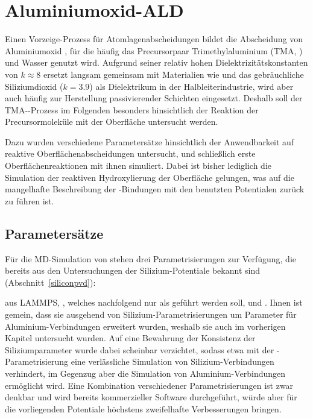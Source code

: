 \section{Aluminiumoxid-ALD}
\label{aluminaald}

Einen Vorzeige-Prozess für Atomlagenabscheidungen bildet die Abscheidung von Aluminiumoxid , für die häufig das Precursorpaar Trimethylaluminium (TMA, ) und Wasser genutzt wird\cite{puurunen_surface_2005}.
Aufgrund seiner relativ hohen Dielektrizitätskonstanten von $k\approx 8$ ersetzt  langsam gemeinsam mit Materialien wie  und \cite{smith_chemical_2000} das gebräuchliche Siliziumdioxid ($k=3.9$) als Dielektrikum in der Halbleiterindustrie, wird aber auch häufig zur Herstellung passivierender Schichten eingesetzt\cite{yun_passivation_2004,poodt_high-speed_2010}.
Deshalb soll der TMA--Prozess im Folgenden besonders hinsichtlich der Reaktion der Precursormoleküle mit der Oberfläche untersucht werden.

Dazu wurden verschiedene Parametersätze hinsichtlich der Anwendbarkeit auf reaktive Oberflächenabscheidungen untersucht, und schließlich erste Oberflächenreaktionen mit ihnen simuliert.
Dabei ist bisher lediglich die Simulation der reaktiven Hydroxylierung der Oberfläche gelungen, was auf die mangelhafte Beschreibung der -Bindungen mit den benutzten Potentialen zurück zu führen ist.

\subsection{Parametersätze}

Für die MD-Simulation von  stehen drei Parametrisierungen zur Verfügung, die bereits aus den Untersuchungen der Silizium-Potentiale bekannt sind (Abschnitt~\ref{siliconpvd}):

 aus LAMMPS\cite{plimpton_lammps_2014}, \cite{liu_development_2012}, welches nachfolgend nur als  geführt werden soll, und \cite{narayanan_reactive_2012}.
Ihnen ist gemein, dass sie ausgehend von Silizium-Parametrisierungen um Parameter für Aluminium-Verbindungen erweitert wurden, weshalb sie auch im vorherigen Kapitel untersucht wurden.
Auf eine Bewahrung der Konsistenz der Siliziumparameter wurde dabei scheinbar verzichtet, sodass etwa mit der -Parametrisierung eine verlässliche Simulation von Silizium-Verbindungen verhindert, im Gegenzug aber die Simulation von Aluminium-Verbindungen ermöglicht wird.
Eine Kombination verschiedener Parametrisierungen ist zwar denkbar und wird bereits kommerzieller Software durchgeführt\cite{biovia_materials_2014}, würde aber für die vorliegenden Potentiale höchstens zweifelhafte Verbesserungen bringen.

